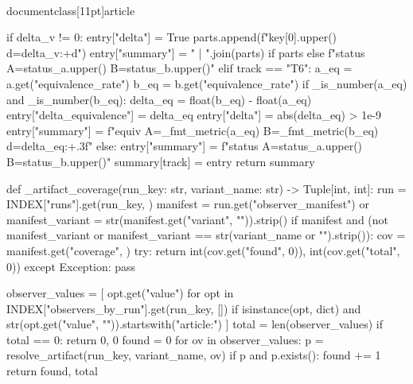 \\documentclass[11pt]{article}
\begin{document}
\begin{CodeBlock}
{                    if delta_v != 0:
                        entry["delta"] = True
                    parts.append(f"{key[0].upper()} d={delta_v:+d}")
            entry["summary"] = " | ".join(parts) if parts else f"status A={status_a.upper()} B={status_b.upper()}"
        elif track == "T6":
            a_eq = a.get("equivalence_rate")
            b_eq = b.get("equivalence_rate")
            if _is_number(a_eq) and _is_number(b_eq):
                delta_eq = float(b_eq) - float(a_eq)
                entry["delta_equivalence"] = delta_eq
                entry["delta"] = abs(delta_eq) > 1e-9
                entry["summary"] = f"equiv A={_fmt_metric(a_eq)} B={_fmt_metric(b_eq)} d={delta_eq:+.3f}"
            else:
                entry["summary"] = f"status A={status_a.upper()} B={status_b.upper()}"
        summary[track] = entry
    return summary


def _artifact_coverage(run_key: str, variant_name: str) -> Tuple[int, int]:
    run = INDEX["runs"].get(run_key, {})
    manifest = run.get("observer_manifest") or {}
    manifest_variant = str(manifest.get("variant", "")).strip()
    if manifest and (not manifest_variant or manifest_variant == str(variant_name or "").strip()):
        cov = manifest.get("coverage", {})
        try:
            return int(cov.get("found", 0)), int(cov.get("total", 0))
        except Exception:
            pass

    observer_values = [
        opt.get("value")
        for opt in INDEX["observers_by_run"].get(run_key, [])
        if isinstance(opt, dict) and str(opt.get("value", "")).startswith("article:")
    ]
    total = len(observer_values)
    if total == 0:
        return 0, 0
    found = 0
    for ov in observer_values:
        p = resolve_artifact(run_key, variant_name, ov)
        if p and p.exists():
            found += 1
    return found, total


}
\end{CodeBlock}
\end{document}
